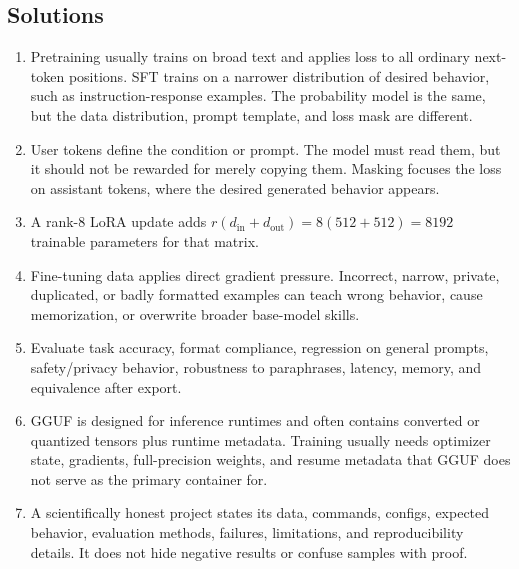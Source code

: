 \subsection*{Solutions}

\begin{enumerate}
  \item Pretraining usually trains on broad text and applies loss to all ordinary next-token positions. SFT trains on a narrower distribution of desired behavior, such as instruction-response examples. The probability model is the same, but the data distribution, prompt template, and loss mask are different.
  \item User tokens define the condition or prompt. The model must read them, but it should not be rewarded for merely copying them. Masking focuses the loss on assistant tokens, where the desired generated behavior appears.
  \item A rank-8 LoRA update adds \(r(d_{\text{in}}+d_{\text{out}})=8(512+512)=8192\) trainable parameters for that matrix.
  \item Fine-tuning data applies direct gradient pressure. Incorrect, narrow, private, duplicated, or badly formatted examples can teach wrong behavior, cause memorization, or overwrite broader base-model skills.
  \item Evaluate task accuracy, format compliance, regression on general prompts, safety/privacy behavior, robustness to paraphrases, latency, memory, and equivalence after export.
  \item GGUF is designed for inference runtimes and often contains converted or quantized tensors plus runtime metadata. Training usually needs optimizer state, gradients, full-precision weights, and resume metadata that GGUF does not serve as the primary container for.
  \item A scientifically honest project states its data, commands, configs, expected behavior, evaluation methods, failures, limitations, and reproducibility details. It does not hide negative results or confuse samples with proof.
\end{enumerate}

